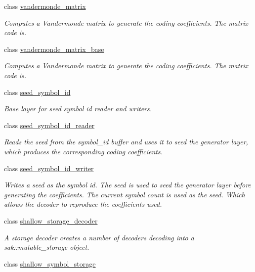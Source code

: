 \begin{DoxyCompactItemize}
class \hyperlink{classkodo_1_1vandermonde__matrix}{vandermonde\-\_\-matrix}
\begin{DoxyCompactList}\small\item\em Computes a Vandermonde matrix to generate the coding coefficients. The matrix code is. \end{DoxyCompactList}\item 
class \hyperlink{classkodo_1_1vandermonde__matrix__base}{vandermonde\-\_\-matrix\-\_\-base}
\begin{DoxyCompactList}\small\item\em Computes a Vandermonde matrix to generate the coding coefficients. The matrix code is. \end{DoxyCompactList}\item 
class \hyperlink{classkodo_1_1seed__symbol__id}{seed\-\_\-symbol\-\_\-id}
\begin{DoxyCompactList}\small\item\em Base layer for seed symbol id reader and writers. \end{DoxyCompactList}\item 
class \hyperlink{classkodo_1_1seed__symbol__id__reader}{seed\-\_\-symbol\-\_\-id\-\_\-reader}
\begin{DoxyCompactList}\small\item\em Reads the seed from the symbol\-\_\-id buffer and uses it to seed the generator layer, which produces the corresponding coding coefficients. \end{DoxyCompactList}\item 
class \hyperlink{classkodo_1_1seed__symbol__id__writer}{seed\-\_\-symbol\-\_\-id\-\_\-writer}
\begin{DoxyCompactList}\small\item\em Writes a seed as the symbol id. The seed is used to seed the generator layer before generating the coefficients. The current symbol count is used as the seed. Which allows the decoder to reproduce the coefficients used. \end{DoxyCompactList}\item 
class \hyperlink{classkodo_1_1shallow__storage__decoder}{shallow\-\_\-storage\-\_\-decoder}
\begin{DoxyCompactList}\small\item\em A storage decoder creates a number of decoders decoding into a sak\-::mutable\-\_\-storage object. \end{DoxyCompactList}\item 
class \hyperlink{classkodo_1_1shallow__symbol__storage}{shallow\-\_\-symbol\-\_\-storage}

\end{DoxyCompactItemize}
